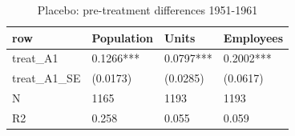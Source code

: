 \begin{table}

\caption{Placebo: pre-treatment differences 1951-1961}
\centering
\begin{tabular}[t]{llll}
\toprule
row & Population & Units & Employees\\
\midrule
treat\_A1 & 0.1266*** & 0.0797*** & 0.2002***\\
treat\_A1\_SE & (0.0173) & (0.0285) & (0.0617)\\
N & 1165 & 1193 & 1193\\
R2 & 0.258 & 0.055 & 0.059\\
\bottomrule
\end{tabular}
\end{table}
